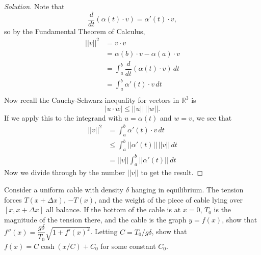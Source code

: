 \documentclass[Shifrin_Solutions_Spring_2018]{subfiles}
\begin{document}
\begin{proof}[Solution]
Note that
\[
\dfrac{d}{dt}\left( \alpha(t)\cdot v \right) = \alpha'(t)\cdot v ,
\]
so by the Fundamental Theorem of Calculus,
\[
\begin{split}
||v||^2 & = v \cdot v \\
  & =  \alpha(b)\cdot v - \alpha(a) \cdot v  \\
	& =  \int_a^b \dfrac{d}{dt}\left( \alpha(t)\cdot v \right) \, dt \\
  & = \int_a^b \alpha'(t)\cdot v \, dt \\
\end{split}
\]
Now recall the Cauchy-Schwarz inequality for vectors in $\mathbb{R}^3$ is
\[
| u \cdot w | \leq ||u||\, ||w||.
\]
If we apply this to the integrand with $u = \alpha(t)$ and $w=v$, we see that
\[
\begin{split}
||v||^2 & = \int_a^b \alpha'(t) \cdot v \, dt \\
	& \leq \int_a^b ||\alpha'(t)|| \, ||v||\, dt \\
  & = ||v|| \int_a^b ||\alpha'(t)||\, dt
\end{split}
\]
Now we divide through by the number $||v||$ to get the result.
\end{proof}

\clearpage



\begin{exercise}
Consider a uniform cable with density $\delta$ hanging in equilibrium. The 
tension forces $T(x + \Delta x)$, $-T(x)$, and the weight of the piece of cable 
lying over $[x,x+\Delta x]$ all balance. If the bottom of the cable is at $x=0$, 
$T_0$ is the magnitude of the tension there, and the cable is the graph $y=f(x)$, 
show that $f''(x) = \dfrac{g\delta}{T_0}\sqrt{1 + f'(x)^2}$.  Letting 
$C = T_0/g\delta$, show that $f(x) = C\cosh(x/C) + C_0$ for some constant $C_0$.
\end{exercise}
\end{document}
